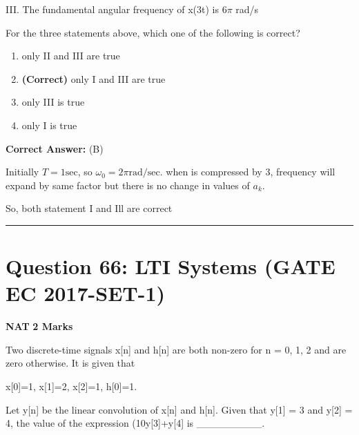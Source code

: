 \documentclass[11pt,a4paper]{article}
\begin{document}
III. The fundamental angular frequency of x(3t) is 6$\pi$ rad/s  

For the three statements above, which one of the following is correct?


\begin{enumerate}[label=(\Alph*)]
    \item only II and III are true
    \item \textbf{(Correct)} only I and III are true
    \item only III is true
    \item only I is true
\end{enumerate}

\noindent \textbf{Correct Answer:} (B)

\begin{tcolorbox}[solbox, title=Detailed Solution -- Question 65]
Initially $T = 1\text{sec}$, so $\omega_{0} = 2\pi \text{rad/sec}.$ when
is compressed by 3, frequency will expand by
same factor but there is no change in values of $a_{k}.$

So, both statement I and Ill are correct
\end{tcolorbox}

\vspace{1.5em}
\hrule
\vspace{1.5em}

\section*{Question 66: LTI Systems (GATE EC 2017-SET-1)}
\noindent \textbf{\color{primary}NAT} \hfill \textbf{\color{secondary}2 Marks}


\noindent Two discrete-time signals x[n] and h[n] are both non-zero for n = 0, 1, 2 and are zero otherwise. It is given that 

x[0]=1, x[1]=2, x[2]=1, h[0]=1.  

Let y[n] be the linear convolution of x[n] and h[n]. Given that y[1] = 3 and y[2] = 4, the value of the expression (10y[3]+y[4] is \_\_\_\_\_\_\_\_\_.
\end{document}
